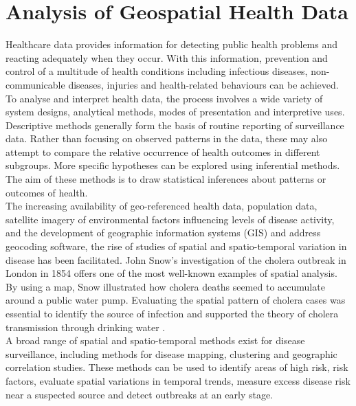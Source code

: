 %

\chapter{Analysis of Geospatial Health Data}
\label{sec:geodata}
Healthcare data provides information for detecting public health problems and reacting adequately when they occur. With this information, prevention and control of a multitude of health conditions including infectious diseases, non-communicable diseases, injuries and health-related behaviours can be achieved. To analyse and interpret health data, the process involves a wide variety of system designs, analytical methods, modes of presentation and interpretive uses\autocite[][]{teutsch2000principles}. Descriptive methods generally form the basis of routine reporting of surveillance data. Rather than focusing on observed patterns in the data, these may also attempt to compare the relative occurrence of health outcomes in different subgroups. More specific hypotheses can be explored using inferential methods. The aim of these methods is to draw statistical inferences about patterns or outcomes of health. \\
The increasing availability of geo-referenced health data, population data, satellite imagery of environmental factors influencing levels of disease activity, and the development of geographic information systems (GIS) and address geocoding software, the rise of studies of spatial and spatio-temporal variation in disease has been facilitated. John Snow's investigation of the cholera outbreak in London in 1854 offers one of the most well-known examples of spatial analysis. By using a map, Snow illustrated how cholera deaths seemed to accumulate around a public water pump. Evaluating the spatial pattern of cholera cases was essential to identify the source of infection and supported the theory of cholera transmission through drinking water \autocite[][]{snow1857cholera}. \\
A broad range of spatial and spatio-temporal methods exist for disease surveillance, including methods for disease mapping, clustering and geographic correlation studies. These methods can be used to identify areas of high risk, risk factors, evaluate spatial variations in temporal trends, measure excess disease risk near a suspected source and detect outbreaks at an early stage.
\clearpage
